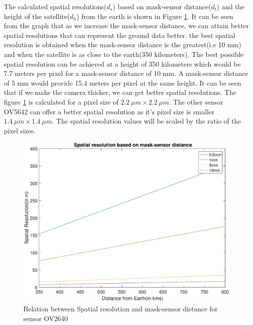 The calculated spatial resolutions($d_s$) based on mask-sensor distance($d_t$) and the height of the satellite($d_h$) from the earth is shown in Figure \ref{fig:spat-res-graph-1}. It can be seen from the graph that as we increase the mask-sensor distance, we can attain better spatial resolutions that can represent the ground data better. the best spatial resolution is obtained when the mask-sensor distance is the greatest(i.e 10 mm) and when the satellite is as close to the earth(350 kilometers). The best possible spatial resolution can be achieved at a height of 350 kilometers which would be 7.7 meters per pixel for a mask-sensor distance of 10 mm. A mask-sensor distance of 5 mm would provide 15.4 meters per pixel at the same height. It can be seen that if we make the camera thicker, we can get better spatial resolutions. The figure \ref{fig:spat-res-graph-1} is calculated for a pixel size of $2.2 \ \mu m \times 2.2 \ \mu m$. The other sensor OV5642 can offer a better spatial resolution as it's pixel size is smaller $1.4 \ \mu m \times 1.4 \ \mu m$. The spatial resolution values will be scaled by the ratio of the pixel sizes. 

\begin{figure}[]
\centering
\includegraphics[width = \linewidth]{pics/spatial_res}
\caption{Relation between Spatial resolution and mask-sensor distance for sensor OV2640}
\label{fig:spat-res-graph-1}
\end{figure}

